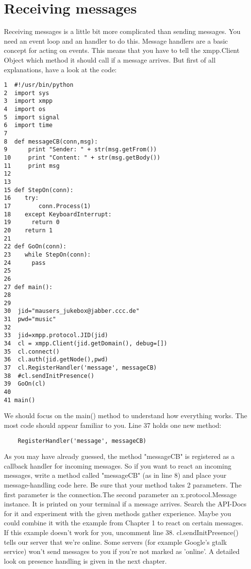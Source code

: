 \section{Receiving messages}

Receiving messages is a little bit more complicated than sending messages. You need an event loop and an handler to do this.
\newline
Message handlers are a basic concept for acting on events. This means that you have to tell the xmpp.Client Object which method it should call if a message arrives. But first of all explanations, have a look at the code:
\newline
\newline
\begin{verbatim}
1  #!/usr/bin/python
2  import sys
3  import xmpp
4  import os
5  import signal
6  import time
7
8  def messageCB(conn,msg):
9      print "Sender: " + str(msg.getFrom())
10     print "Content: " + str(msg.getBody())
11     print msg
12
13
15 def StepOn(conn):
16    try:
17        conn.Process(1)
18    except KeyboardInterrupt:
19	    return 0
20    return 1
21
22 def GoOn(conn):
23    while StepOn(conn):
24	    pass
25
26
27 def main():
28
29
30	jid="mausers_jukebox@jabber.ccc.de"
31	pwd="music"
32
33	jid=xmpp.protocol.JID(jid)
34	cl = xmpp.Client(jid.getDomain(), debug=[])
35	cl.connect()
36	cl.auth(jid.getNode(),pwd)
37	cl.RegisterHandler('message', messageCB)
38	#cl.sendInitPresence()
39	GoOn(cl)
40
41 main()
\end{verbatim}
We should focus on the main() method to understand how everything works. The most code should appear familiar to you. Line 37 holds one new method: \begin{verbatim}	RegisterHandler('message', messageCB)\end{verbatim}
As you may have already guessed, the method "messageCB" is registered as a callback handler for incoming messages. So if you want to react an incoming messages, write a method called "messageCB" (as in line 8)
and place your message-handling code here. Be sure that your method takes 2 parameters.
The first parameter is the connection.The second parameter an x.protocol.Message instance. It is printed on your terminal if a message arrives. Search the API-Docs for it and experiment with the given methods gather experience. Maybe you could combine it with the example from Chapter 1 to react on certain messages.
\newline
\newline
If this example doesn't work for you, uncomment line 38. cl.sendInitPresence() tells our server that we're online. Some servers (for example Google's gtalk service) won't send messages to you if you're not marked as 'online'. A detailed look on presence handling is given in the next chapter.



